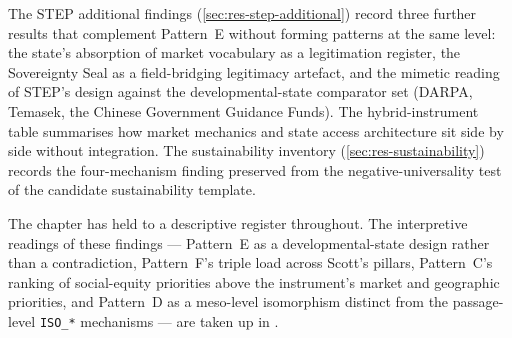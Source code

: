 The STEP additional findings (\cref{sec:res-step-additional}) record
three further results that complement Pattern~E without forming
patterns at the same level: the state's absorption of market
vocabulary as a legitimation register, the Sovereignty Seal as a
field-bridging legitimacy artefact, and the mimetic reading of STEP's
design against the developmental-state comparator set (DARPA,
Temasek, the Chinese Government Guidance Funds). The hybrid-instrument table summarises how market
mechanics and state access architecture sit side by side without
integration. The sustainability inventory
(\cref{sec:res-sustainability}) records the four-mechanism finding
preserved from the negative-universality test of the candidate
sustainability template.

The chapter has held to a descriptive register throughout. The
interpretive readings of these findings --- Pattern~E as a
developmental-state design rather than a contradiction, Pattern~F's
triple load across Scott's pillars, Pattern~C's ranking of
social-equity priorities above the instrument's market and
geographic priorities, and Pattern~D as a meso-level isomorphism
distinct from the passage-level \texttt{ISO\_*} mechanisms --- are
taken up in .
